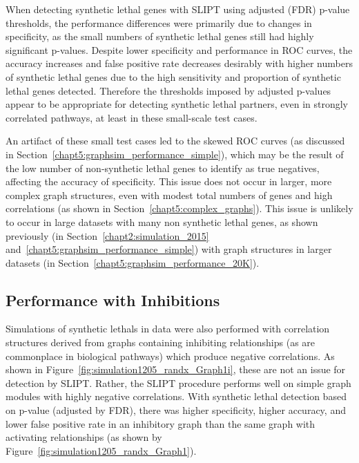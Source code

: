 When detecting \gls{synthetic lethal} genes with \gls{SLIPT} using adjusted (\gls{FDR}) p-value thresholds, the performance differences were primarily due to changes in specificity, as the small numbers of \gls{synthetic lethal} genes still had highly significant p-values. Despite lower specificity and performance in \gls{ROC} curves, the accuracy increases and false positive rate decreases desirably with higher numbers of \gls{synthetic lethal} genes due to the high sensitivity and proportion of \gls{synthetic lethal} genes detected. Therefore the thresholds imposed by adjusted p-values appear to be appropriate for detecting \gls{synthetic lethal} partners, even in strongly correlated pathways, at least in these small-scale test cases.

An artifact of these small test cases led to the skewed \gls{ROC} curves (as discussed in Section~\ref{chapt5:graphsim_performance_simple}), which may be the result of the low number of non-synthetic lethal genes to identify as true negatives, affecting the accuracy of specificity. This issue does not occur in larger, more complex \gls{graph} structures, even with modest total numbers of genes and high correlations (as shown in Section~\ref{chapt5:complex_graphs}). This issue is unlikely to occur in large  datasets with many non \gls{synthetic lethal} genes, as shown previously (in Section~\ref{chapt2:simulation_2015} and~\ref{chapt5:graphsim_performance_simple}) with \gls{graph} structures in larger datasets (in Section~\ref{chapt5:graphsim_performance_20K}). 

\FloatBarrier


\subsection{Performance with Inhibitions}
\label{chapt5:graphsim_performance_inhib}

\FloatBarrier

Simulations of \glspl{synthetic lethal} in  data were also performed with correlation structures derived from \glspl{graph} containing inhibiting relationships (as are commonplace in biological pathways) which produce negative correlations. As shown in Figure~\ref{fig:simulation1205_randx_Graph1i}, these are not an issue for detection by \gls{SLIPT}. Rather, the \gls{SLIPT} procedure performs well on simple graph modules with highly negative correlations. With \gls{synthetic lethal} detection based on p-value (adjusted by \gls{FDR}), there was higher specificity, higher accuracy, and lower false positive rate in an inhibitory graph than the same graph with activating relationships (as shown by Figure~\ref{fig:simulation1205_randx_Graph1}).

